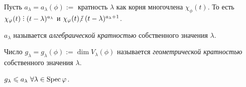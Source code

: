 Пусть $a_\lambda = a_\lambda(\phi) := $ кратность $\lambda$ как корня многочлена $\chi_\phi(t)$. То есть $\chi_\phi(t) \divby (t - \lambda)^{a_\lambda}$ и $\chi_\phi(t) \!\!\not\;\divby (t - \lambda)^{a_\lambda + 1}$.

\begin{definition}
    $a_\lambda$ называется \textit{алгебраической кратностью} собственного значения $\lambda$.
\end{definition}

\begin{definition}
    Число $g_\lambda = g_\lambda(\phi) := \dim V_\lambda(\phi)$ называется \textit{геометрической кратностью} собственного значения $\lambda$.
\end{definition}

\begin{comment}
    $a_\lambda \geq 1$, $g_\lambda \geq 1 \ \forall \lambda \in \spec \phi$.
\end{comment}

\begin{proposal}
    $g_\lambda \leqslant a_\lambda \ \forall \lambda \in \operatorname{\mathop{\mathrm{Spec}}} \varphi$.
\end{proposal}

